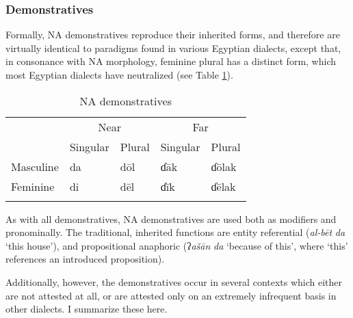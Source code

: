 \documentclass[output=paper]{langsci/langscibook}
\begin{document}
\subsubsection{Demonstratives} \label{demons}

Formally, NA {demonstratives} reproduce their inherited forms, and therefore are virtually identical to paradigms found in various Egyptian dialects, except that, in consonance with NA morphology, feminine plural has a distinct form, which most Egyptian dialects have neutralized (see Table \ref{demtab}).

\begin{table}

\begin{tabularx}{.655\textwidth}{lllll}
\lsptoprule
     & \multicolumn{2}{c}{Near}       & \multicolumn{2}{c}{Far} \\
& Singular &  Plural & Singular & Plural\\
\midrule
Masculine & da & dōl & ɗāk & ɗōlak\\
Feminine & di & dēl & ɗīk & ɗēlak\\
\lspbottomrule
\end{tabularx}
\caption{\label{bkm:Ref520909612}NA demonstratives}
\label{demtab}
\end{table}

As with all  {demonstratives}, NA {demonstratives} are used both as modifiers and pronominally. The traditional, inherited functions are entity referential (\textit{al-bēt} \textit{da} ‘this house’), and propositional anaphoric (ʔ\textit{ašān} \textit{da} ‘because of this’, where ‘this’ references an introduced proposition).

Additionally, however, the {demonstratives} occur in several contexts which either are not attested at all, or are attested only on an extremely infrequent basis in other  dialects. I summarize these here.
\end{document}
